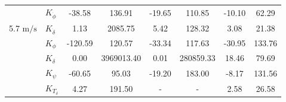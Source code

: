 \begin{table}[]
\begin{tabular}{llcccccc}
                                                   & $K_{\dot{\phi}} $                                      & -38.58                                      & 136.91                                               & -19.65                                      & 110.85                                               & -10.10                                      & 62.29                                                \\
    \multirow{-2}{*}{5.7 $\si{\meter\per\second}$} & $K_{\dot{\delta}}$                                     & 1.13                                        & 2085.75                                              & 5.42                                        & 128.32                                               & 3.08                                        & 21.38                                                \\
                                                   & $K_{\phi} $                                            & -120.59                                     & 120.57                                               & -33.34                                      & 117.63                                               & -30.95                                      & 133.76                                               \\
                                                   & $K_\delta $                                            & 0.00                                        & 3969013.40                                           & 0.01                                        & 280859.33                                            & 18.46                                       & 79.69                                                \\
                                                   & $K_\psi $                                              & -60.65                                      & 95.03                                                & -19.20                                      & 183.00                                               & -8.17                                       & 131.56                                               \\
                                                   & $K_{T_\delta}$                                         & 4.27                                        & 191.50                                               & -                                           & -                                                    & 2.58                                        & 26.58                                                \\ \cline{2-8} 

\end{tabular}
\end{table}
